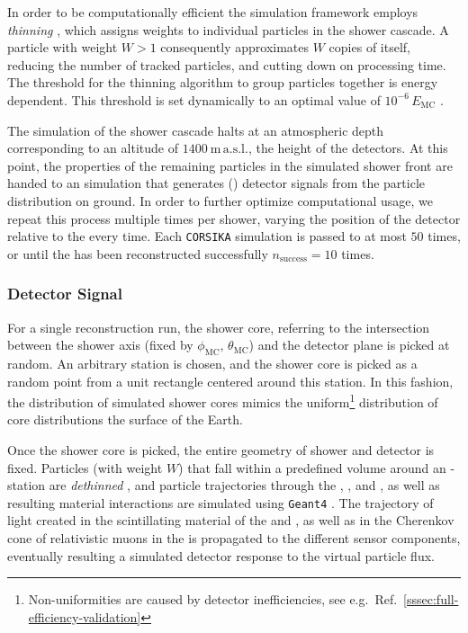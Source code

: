 
In order to be computationally efficient the simulation framework employs 
\emph{thinning} \cite{saffiAnalysisSimulationReconstruction2020}, which assigns
weights to individual particles in the shower cascade. A particle with weight 
$W > 1$ consequently approximates $W$ copies of itself, reducing the number of 
tracked particles, and cutting down on processing time. The threshold for the 
thinning algorithm to group particles together is energy dependent. This 
threshold is set dynamically to an optimal value of $10^{-6}\,E_\mathrm{MC}$ 
\cite{billoirSamplingProcedureRegenerate2008}.

The simulation of the shower cascade halts at an atmospheric depth corresponding
to an altitude of $\SI{1400}{\meter}\,\mathrm{a.s.l.}$, the height of the \PAOs 
detectors. At this point, the properties of the remaining particles in the 
simulated shower front are handed to an \Offline simulation that generates (\SD)
detector signals from the particle distribution on ground. In order to further 
optimize computational usage, we repeat this process multiple times per shower, 
varying the position of the \SD detector relative to the \EAS every time. Each 
\texttt{CORSIKA} simulation is passed to \Offline at most $50$ times, or until 
the \EAS has been reconstructed successfully $n_\mathrm{success} = 10$ times. 

\subsubsection{Detector Signal}

For a single reconstruction run, the shower core, referring to the intersection 
between the shower axis (fixed by $\phi_\mathrm{MC},\,\theta_\mathrm{MC}$) and 
the detector plane is picked at random. An arbitrary  station is chosen, 
and the shower core is picked as a random point from a unit rectangle centered 
around this station. In this fashion, the distribution of simulated shower cores
mimics the uniform\footnote{Non-uniformities are caused by detector 
inefficiencies, see e.g.~Ref.~\cref{sssec:full-efficiency-validation}} 
distribution of \EASs core distributions the surface of the Earth. 

Once the shower core is picked, the entire geometry of shower and detector is 
fixed. Particles (with weight $W$) that fall within a predefined volume around 
an \SD-station are \emph{dethinned} 
\cite{saffiAnalysisSimulationReconstruction2020}, and particle trajectories
through the \WCD, \SSD, and \UMD, as well as resulting material interactions are
simulated using \texttt{Geant4} \cite{allisonRecentDevelopmentsGeant42016, 
allisonGeant4DevelopmentsApplications2006, 
agostinelliGeant4aSimulationToolkit2003}. The trajectory of light created in the
scintillating material of the \SSD and \UMD, as well as in the Cherenkov cone of
relativistic muons in the \WCD is propagated to the different sensor components,
eventually resulting a simulated detector response to the virtual particle flux.

